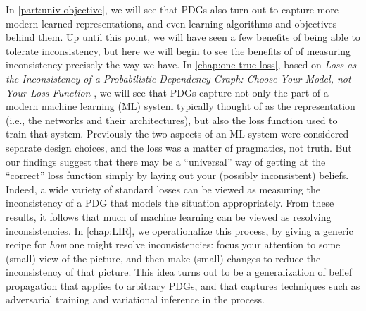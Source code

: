 \textbf{}
In \cref{part:univ-objective}, we will see that
PDGs also turn out to capture more modern learned representations, 
    and even learning algorithms and objectives behind them. 
Up until this point, we will have seen a few benefits of being able to tolerate inconsistency, but here we will begin to see the benefits of of measuring inconsistency precisely the way we have. 
In \cref{chap:one-true-loss}, 
based on
\textit{Loss as the Inconsistency of a Probabilistic Dependency Graph: Choose Your Model, not Your Loss Function} \citep{one-true-loss}, 
we will see that PDGs capture not only the part of a modern machine learning (ML) system typically thought of as the representation (i.e., the networks and their architectures), but also the loss function used to train that system.  
Previously the two aspects of an ML system were considered separate design choices, and the loss was a matter of pragmatics, not truth. 
But our findings suggest that 
there may be a ``universal'' way of getting at the ``correct'' loss function simply by laying out your (possibly inconsistent) beliefs. 
Indeed, a wide variety of standard losses can be viewed as measuring the inconsistency of a PDG that models the situation appropriately. 
%
From these results, it follows that much of machine learning can be viewed as resolving inconsistencies. 
%
In \cref{chap:LIR}, we operationalize this process, by giving a generic recipe for \emph{how} one might resolve inconsistencies:
focus your attention to some (small) view of the picture, and then make (small) changes to reduce the inconsistency of that picture. 
%
This idea turns out to be a generalization of {belief propagation} that applies to arbitrary PDGs, and that captures techniques such as adversarial training and variational inference in the process. 



